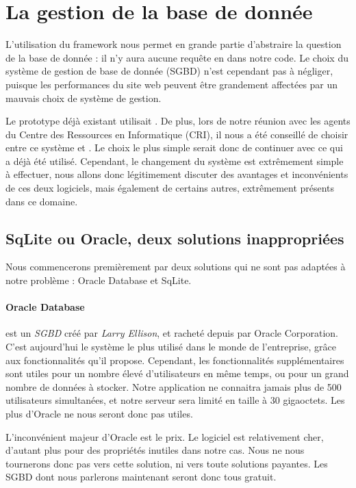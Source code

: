 \section{La gestion de la base de donnée}

L'utilisation du framework \symfony nous permet en grande partie d'abstraire la question de la base de donnée : il n'y aura aucune requête en \sql dans notre code. 
Le choix du système de gestion de base de donnée (SGBD) n'est cependant pas  à négliger, puisque les performances du site web peuvent être grandement affectées par un mauvais choix de système de gestion. 

Le prototype déjà existant utilisait \mysql. 
De plus, lors de notre réunion avec les agents du Centre des Ressources en Informatique (CRI), il nous a été conseillé de choisir entre ce système et \psql. 
Le choix le plus simple serait donc de continuer avec ce qui a déjà été utilisé. 
Cependant, le changement du système est extrêmement simple à effectuer, nous allons donc légitimement  discuter des avantages et inconvénients de ces deux logiciels, mais également de certains autres, extrêmement présents dans ce domaine. 

\subsection{SqLite ou Oracle, deux solutions inappropriées}

Nous commencerons premièrement par deux solutions qui ne sont pas adaptées à notre problème : Oracle Database et SqLite. 

\paragraph*{Oracle Database } est un \textit{SGBD} créé par \textit{Larry Ellison}, et racheté depuis par Oracle Corporation. C'est aujourd'hui le système le plus utilisé dans le monde de l'entreprise, grâce aux fonctionnalités qu'il propose. 
Cependant, les fonctionnalités supplémentaires sont utiles pour un nombre élevé d'utilisateurs en même temps, ou pour un grand nombre de données à stocker. Notre application ne connaitra jamais plus de 500 utilisateurs simultanées, et notre serveur sera limité en taille à 30 gigaoctets. Les plus d'Oracle ne nous seront donc pas utiles. 

L'inconvénient majeur d'Oracle est le prix. Le logiciel est relativement cher, d'autant plus pour des propriétés inutiles dans notre cas.
Nous ne nous tournerons donc pas vers cette solution, ni vers toute solutions payantes. Les SGBD dont nous parlerons maintenant seront donc tous gratuit. 


